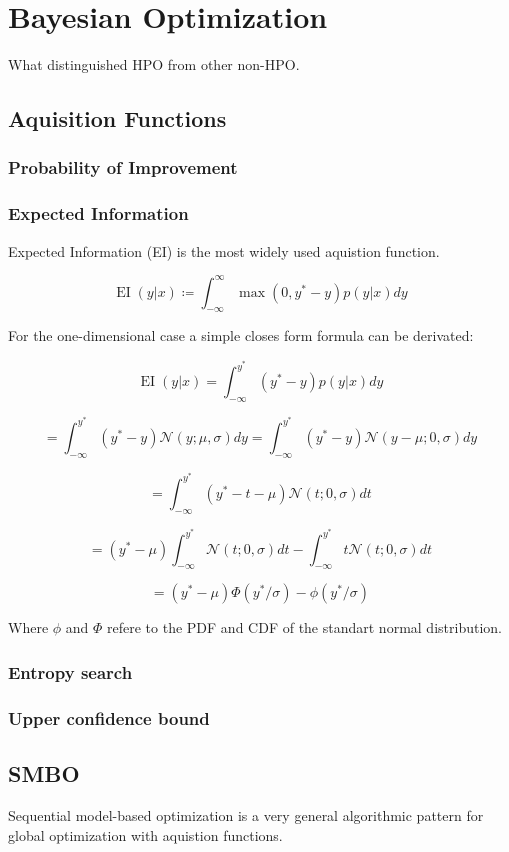 \documentclass[english]{article}
\newcommand{\EI}{\operatorname{EI}}
\newcommand{\normal}{\mathcal{N}}
\begin{document}
\section{Bayesian Optimization}
What distinguished HPO from other non-HPO.

\subsection{Aquisition Functions}

\subsubsection{Probability of Improvement}
\subsubsection{Expected Information}

Expected Information (EI) is the most widely used aquistion function.

$$ \EI(y|x) \coloneqq \int_{-\infty}^{\infty} \max(0, y^*-y)p(y|x)dy $$

For the one-dimensional case a simple closes form formula can be derivated:

$$ \EI(y|x) = \int_{-\infty}^{y^*}(y^*-y)p(y|x)dy$$

$$ = \int_{-\infty}^{y^*}(y^*-y)\normal(y; \mu, \sigma)dy =
\int_{-\infty}^{y^*}(y^*-y)\normal(y-\mu; 0, \sigma)dy$$

$$ = \int_{-\infty}^{y^*}(y^*- t - \mu)\normal(t; 0, \sigma)dt $$

$$ = (y^*-\mu)\int_{-\infty}^{y^*}\normal(t; 0, \sigma)dt - \int_{-\infty}^{y^*}t\normal(t; 0, \sigma)dt$$

$$ = (y^*-\mu)\Phi(y^*/\sigma) - \phi(y^*/\sigma) $$

Where $\phi$ and $\Phi$ refere to the PDF and CDF of the standart normal distribution.

\subsubsection{Entropy search}
\subsubsection{Upper confidence bound}

\subsection{SMBO}
Sequential model-based optimization is a very general algorithmic pattern for global optimization with aquistion functions.
\end{document}
